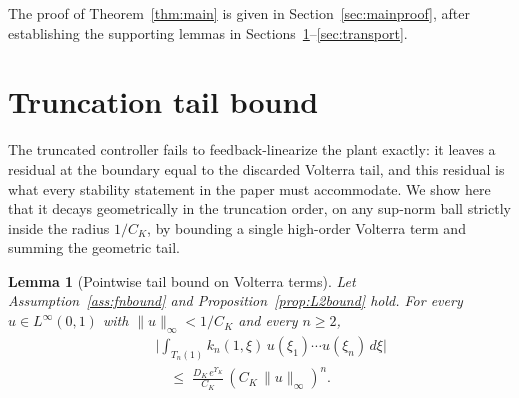 \documentclass[amsthm]{autart}
\theoremstyle{plain}
\newtheorem{lemma}{Lemma}
\theoremstyle{definition}
\newcommand{\Linf}{L^\infty}
\begin{document}
The proof of Theorem~\ref{thm:main} is given in Section~\ref{sec:mainproof}, after establishing the supporting lemmas in Sections~\ref{sec:tail}--\ref{sec:transport}.

\section{Truncation tail bound}\label{sec:tail}

The truncated controller fails to feedback-linearize the plant exactly: it leaves a residual at the boundary equal to the discarded Volterra tail, and this residual is what every stability statement in the paper must accommodate. We show here that it decays geometrically in the truncation order, on any sup-norm ball strictly inside the radius $1/C_K$, by bounding a single high-order Volterra term and summing the geometric tail.

\begin{lemma}[Pointwise tail bound on Volterra terms]\label{lem:pointwise_tail}
Let Assumption~\ref{ass:fnbound} and Proposition~\ref{prop:L2bound} hold. For every $u \in \Linf(0,1)$ with $\|u\|_\infty < 1/C_K$ and every $n \ge 2$,
\begin{eqnarray}
&& \biggl|\int_{T_n(1)} k_n(1,\xi)\, u(\xi_1)\cdots u(\xi_n)\, d\xi\biggr| \nonumber \\
&& \quad \le\; \frac{D_K\, e^{\Upsilon_K}}{C_K}\,(C_K\,\|u\|_\infty)^n.
\label{eq:pointwise_tail}
\end{eqnarray}
\end{lemma}
\end{document}
